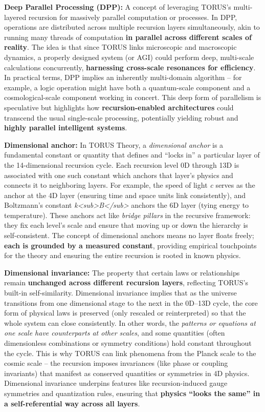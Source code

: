 \documentclass[]{article}
\begin{document}
{\textbf{Deep Parallel Processing (DPP):} A concept of leveraging TORUS's
multi-layered recursion for massively parallel computation or processes.
In DPP, operations are distributed across multiple recursion layers
simultaneously, akin to running many threads of computation \textbf{in
parallel across different scales of reality}. The idea is that since
TORUS links microscopic and macroscopic dynamics, a properly designed
system (or AGI) could perform deep, multi-scale calculations
concurrently, \textbf{harnessing cross-scale resonances for
efficiency}​. In practical terms, DPP implies an inherently multi-domain
algorithm -- for example, a logic operation might have both a
quantum-scale component and a cosmological-scale component working in
concert​. This deep form of parallelism is speculative but highlights
how \textbf{recursion-enabled architectures} could transcend the usual
single-scale processing, potentially yielding robust and \textbf{highly
parallel intelligent systems}.

\textbf{Dimensional anchor:} In TORUS Theory, a \emph{dimensional
anchor} is a fundamental constant or quantity that defines and ``locks
in'' a particular layer of the 14-dimensional recursion cycle. Each
recursion level 0D through 13D is associated with one such constant
which anchors that layer's physics and connects it to neighboring
layers​. For example, the speed of light \emph{c} serves as the anchor
at the 4D layer (ensuring time and space units link consistently), and
Boltzmann's constant
\emph{k\textless{}sub\textgreater{}B\textless{}/sub\textgreater{}}
anchors the 6D layer (tying energy to temperature)​. These anchors act
like \emph{bridge pillars} in the recursive framework: they fix each
level's scale and ensure that moving up or down the hierarchy is
self-consistent. The concept of dimensional anchors means no layer
floats freely; \textbf{each is grounded by a measured constant},
providing empirical touchpoints for the theory and ensuring the entire
recursion is rooted in known physics​.

\textbf{Dimensional invariance:} The property that certain laws or
relationships remain \textbf{unchanged across different recursion
layers}, reflecting TORUS's built-in self-similarity. Dimensional
invariance implies that as the universe transitions from one dimensional
stage to the next in the 0D--13D cycle, the core form of physical laws
is preserved (only rescaled or reinterpreted) so that the whole system
can close consistently. In other words, the \emph{patterns or equations
at one scale have counterparts at other scales}, and some quantities
(often dimensionless combinations or symmetry conditions) hold constant
throughout the cycle​. This is why TORUS can link phenomena from the
Planck scale to the cosmic scale -- the recursion imposes invariances
(like phase or coupling invariants) that manifest as conserved
quantities or symmetries in 4D physics​. Dimensional invariance
underpins features like recursion-induced gauge symmetries and
quantization rules, ensuring that \textbf{physics ``looks the same'' in
a self-referential way across all layers}.

}
\end{document}
